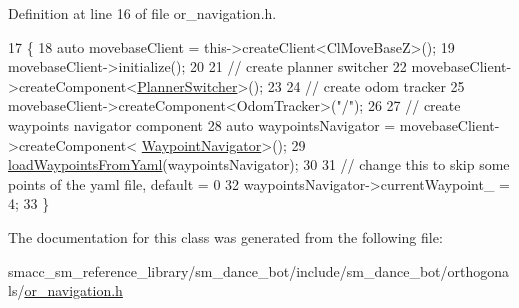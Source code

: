 Definition at line 16 of file or\+\_\+navigation.\+h.


\begin{DoxyCode}
17     \{
18         \textcolor{keyword}{auto} movebaseClient = this->createClient<ClMoveBaseZ>();
19         movebaseClient->initialize();
20 
21         \textcolor{comment}{// create planner switcher}
22         movebaseClient->createComponent<\hyperlink{classmove__base__z__client_1_1PlannerSwitcher}{PlannerSwitcher}>();
23 
24         \textcolor{comment}{// create odom tracker}
25         movebaseClient->createComponent<OdomTracker>(\textcolor{stringliteral}{"/"});
26 
27         \textcolor{comment}{// create waypoints navigator component}
28         \textcolor{keyword}{auto} waypointsNavigator = movebaseClient->createComponent<
      \hyperlink{classmove__base__z__client_1_1WaypointNavigator}{WaypointNavigator}>();
29         \hyperlink{classsm__dance__bot_1_1OrNavigation_a1f092ffe3a1b29ae9ea6623aff00ab16}{loadWaypointsFromYaml}(waypointsNavigator);
30 
31         \textcolor{comment}{// change this to skip some points of the yaml file, default = 0}
32         waypointsNavigator->currentWaypoint\_ = 4;
33     \}
\end{DoxyCode}


The documentation for this class was generated from the following file\+:\begin{DoxyCompactItemize}
\item 
smacc\+\_\+sm\+\_\+reference\+\_\+library/sm\+\_\+dance\+\_\+bot/include/sm\+\_\+dance\+\_\+bot/orthogonals/\hyperlink{sm__dance__bot_2include_2sm__dance__bot_2orthogonals_2or__navigation_8h}{or\+\_\+navigation.\+h}\end{DoxyCompactItemize}
